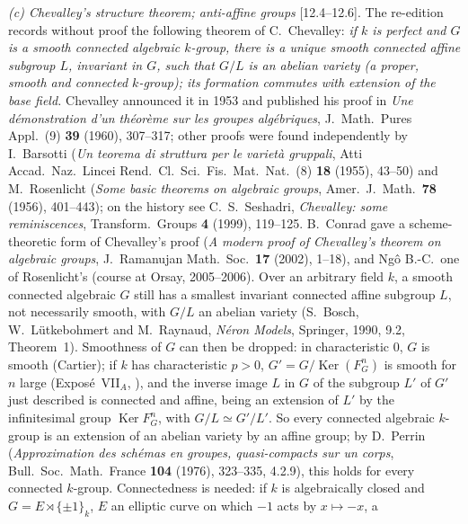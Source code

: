 \par\smallskip\noindent\textit{(c) Chevalley's structure theorem; anti-affine groups}
[12.4--12.6]. The re-edition records without proof the following theorem of C.~Chevalley:
\emph{if \(k\) is perfect and \(G\) is a smooth connected algebraic \(k\)-group, there is a
unique smooth connected affine subgroup \(L\), invariant in \(G\), such that \(G/L\) is an
abelian variety \textup{(}a proper, smooth and connected \(k\)-group\textup{)}; its formation
commutes with extension of the base field.} Chevalley announced it in 1953 and published his
proof in \emph{Une d\'emonstration d'un th\'eor\`eme sur les groupes alg\'ebriques},
J.\ Math.\ Pures Appl.\ (9) \textbf{39} (1960), 307--317; other proofs were found independently
by I.~Barsotti (\emph{Un teorema di struttura per le variet\`a gruppali}, Atti Accad.\ Naz.\
Lincei Rend.\ Cl.\ Sci.\ Fis.\ Mat.\ Nat.\ (8) \textbf{18} (1955), 43--50) and M.~Rosenlicht
(\emph{Some basic theorems on algebraic groups}, Amer.\ J.\ Math.\ \textbf{78} (1956),
401--443); on the history see C.~S.~Seshadri, \emph{Chevalley: some reminiscences}, Transform.\
Groups \textbf{4} (1999), 119--125. B.~Conrad gave a scheme-theoretic form of Chevalley's proof
(\emph{A modern proof of Chevalley's theorem on algebraic groups}, J.\ Ramanujan Math.\ Soc.\
\textbf{17} (2002), 1--18), and Ng\^o B.-C.\ one of Rosenlicht's (course at Orsay, 2005--2006).
Over an arbitrary field \(k\), a smooth connected algebraic \(G\) still has a smallest
invariant connected affine subgroup \(L\), not necessarily smooth, with \(G/L\) an abelian
variety (S.~Bosch, W.~L\"utkebohmert and M.~Raynaud, \emph{N\'eron Models}, Springer, 1990,
9.2, Theorem~1). Smoothness of \(G\) can then be dropped: in characteristic \(0\), \(G\) is smooth (Cartier); if
\(k\) has characteristic \(p>0\), \(G'=G/\operatorname{Ker}(F^n_G)\) is smooth for \(n\) large (Expos\'e~VII\(_A\),
\SGARefLink{sga3:VIIA:8.3}{8.3}), and the inverse image \(L\) in \(G\) of the subgroup \(L'\)
of \(G'\) just described is connected and affine, being an extension of \(L'\) by the
infinitesimal group \(\operatorname{Ker}F^n_G\), with \(G/L\simeq G'/L'\). So every connected
algebraic \(k\)-group is an extension of an abelian variety by an affine group; by D.~Perrin
(\emph{Approximation des sch\'emas en groupes, quasi-compacts sur un corps}, Bull.\ Soc.\
Math.\ France \textbf{104} (1976), 323--335, 4.2.9), this holds for every connected
\(k\)-group. Connectedness is needed: if \(k\) is algebraically closed and
\(G=E\rtimes\{\pm1\}_k\), \(E\) an elliptic curve on which \(-1\) acts by \(x\mapsto-x\), a
